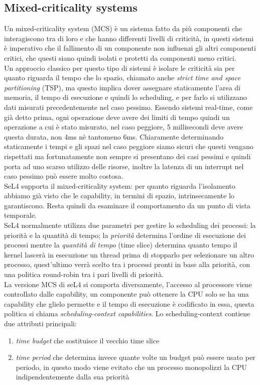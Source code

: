 \subsection{Mixed-criticality systems}
Un mixed-criticality system (MCS) è un sistema fatto da più componenti che interagiscono tra di loro e che hanno differenti livelli di criticità, in questi sistemi è imperativo che il fallimento di un componente non influenzi gli altri componenti critici, che questi siano quindi isolati e protetti da componenti meno critici.\\
Un approccio classico per questo tipo di sistemi è isolare le criticità sia per quanto riguarda il tempo che lo spazio, chiamato anche \textit{strict time and space partitioning} (TSP), ma questo implica dover assegnare staticamente l'area di memoria, il tempo di esecuzione e quindi lo scheduling, e per farlo si utilizzano dati misurati precedentemente nel caso pessimo. Essendo sistemi real-time, come già detto prima, ogni operazione deve avere dei limiti di tempo quindi un operazione a cui è stato misurato, nel caso peggiore, 5 millisecondi deve avere questa durata, non 4ms nè tantomeno 6ms. Chiaramente determinando staticamente i tempi e gli spazi nel caso peggiore siamo sicuri che questi vengano rispettati ma fortunatamente non sempre si presentano dei casi pessimi e quindi porta ad uno scarso utilizzo delle risorse, inoltre la latenza di un interrupt nel caso pessimo può essere molto costosa.\\
SeL4 supporta il mixed-criticality system: per quanto riguarda l'isolamento abbiamo già visto che le capability, in termini di spazio, intrinsecamente lo garantiscono. Resta quindi da esaminare il comportamento da un punto di vista temporale.\\
SeL4 normalmente utilizza due parametri per gestire lo scheduling dei processi: la priorità e la quantità di tempo; la \textit{priorità} determina l'ordine di esecuzione dei processi mentre la \textit{quantità di tempo} (time slice) determina quanto tempo il kernel lascerà in esecuzione un thread prima di stopparlo per selezionare un altro processo, quest'ultimo verrà scelto tra i processi pronti in base alla priorità, con una politica round-robin tra i pari livelli di priorità. \\
La versione MCS di seL4 si comporta diversamente, l'accesso al processore viene controllato dalle capability, un componente può ottenere la CPU solo se ha una capability che glielo permette e il tempo di esecuzione è codificato in essa, questa politica si chiama \textit{scheduling-context capabilities}. Lo scheduling-context contiene due attributi principali: 
\begin{enumerate}
	\item \textit{time budget} che sostituisce il vecchio time slice
	\item \textit{time period} che determina invece quante volte un budget può essere usato per periodo, in questo modo viene evitato che un processo monopolizzi la CPU indipendentemente dalla sua priorità
\end{enumerate}

